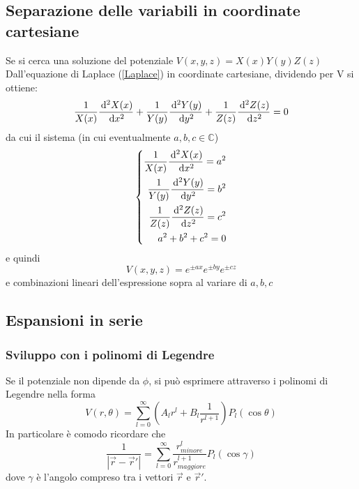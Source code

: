 \documentclass[../main.tex]{subfiles}
\begin{document}
\subsection{Separazione delle variabili in coordinate cartesiane}\label{Separazione}
Se si cerca una soluzione del potenziale $V(x, y, z)=X(x)Y(y)Z(z)$
Dall'equazione di Laplace (\cref{Laplace}) in coordinate cartesiane, dividendo per V si ottiene:
\begin{equation}
  \frac{1}{X(x)}\frac{\,\mathrm d^2X(x)}{\,\mathrm d x^2}+\frac{1}{Y(y)}\frac{\,\mathrm d^2Y(y)}{\,\mathrm d y^2}+\frac{1}{Z(z)}\frac{\,\mathrm d^2Z(z)}{\,\mathrm d z^2}=0
\end{equation}
da cui il sistema (in cui eventualmente $a, b, c \in \mathbb{C}$)
\begin{equation}
  \left\{
    \begin{aligned}
      \frac{1}{X(x)}\frac{\,\mathrm d^2X(x)}{\,\mathrm d x^2}=a^2\\
      \frac{1}{Y(y)}\frac{\,\mathrm d^2Y(y)}{\,\mathrm d y^2}=b^2\\
      \frac{1}{Z(z)}\frac{\,\mathrm d^2Z(z)}{\,\mathrm d z^2}=c^2\\
      a^2+b^2+c^2=0
    \end{aligned}
  \right.
\end{equation}
e quindi
\begin{equation}
  V(x, y, z)=e^{\pm ax}e^{\pm by}e^{\pm cz}
\end{equation}
e combinazioni lineari dell'espressione sopra al variare di $a, b, c$



\subsection{Espansioni in serie}
\subsubsection{Sviluppo con i polinomi di Legendre}
Se il potenziale non dipende da $\phi$, si può esprimere attraverso i polinomi di Legendre nella forma 
\begin{equation}
  \label{Legendre}
  V(r, \theta) = \sum_{l=0}^{\infty} \left ( A_l r^l + B_l \frac{1}{r^{l+1}} \right ) P_l (\cos\theta)
\end{equation}
In particolare è comodo ricordare che
\begin{equation}
  \label{rR} %
  \frac{1}{|\vec r - \vec r'|} = \sum_{l=0}^{\infty} \frac{r_{minore}^l}{r_{maggiore}^{l+1}} P_l (\cos\gamma)
\end{equation}
dove $\gamma$ è l'angolo compreso tra i vettori $\vec r$ e $\vec r'$.
\end{document}
